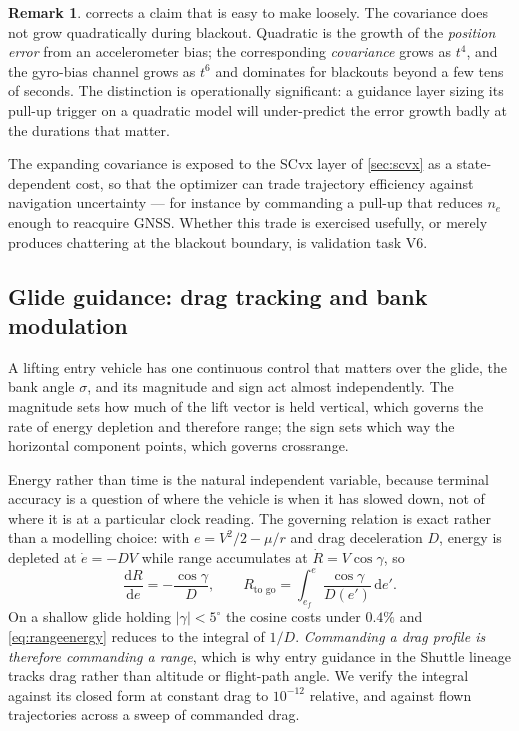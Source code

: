 \documentclass[11pt,a4paper]{article}
\theoremstyle{definition}
\newtheorem{remark}[theorem]{Remark}
\numberwithin{equation}{section}
\begin{document}
\begin{remark}
 corrects a claim that is easy to make loosely. The covariance does not grow quadratically during blackout. Quadratic is the growth of the \emph{position error} from an accelerometer bias; the corresponding \emph{covariance} grows as $t^4$, and the gyro-bias channel grows as $t^6$ and dominates for blackouts beyond a few tens of seconds. The distinction is operationally significant: a guidance layer sizing its pull-up trigger on a quadratic model will under-predict the error growth badly at the durations that matter.
\end{remark}

The expanding covariance is exposed to the SCvx layer of \cref{sec:scvx} as a state-dependent cost, so that the optimizer can trade trajectory efficiency against navigation uncertainty --- for instance by commanding a pull-up that reduces $n_e$ enough to reacquire GNSS. Whether this trade is exercised usefully, or merely produces chattering at the blackout boundary, is validation task V6.

\subsection{Glide guidance: drag tracking and bank modulation}
\label{sec:glide}

A lifting entry vehicle has one continuous control that matters over the glide, the bank angle $\sigma$, and its magnitude and sign act almost independently. The magnitude sets how much of the lift vector is held vertical, which governs the rate of energy depletion and therefore range; the sign sets which way the horizontal component points, which governs crossrange.

Energy rather than time is the natural independent variable, because terminal accuracy is a question of where the vehicle is when it has slowed down, not of where it is at a particular clock reading. The governing relation is exact rather than a modelling choice: with $e = V^2/2 - \mu/r$ and drag deceleration $D$, energy is depleted at $\dot e = -DV$ while range accumulates at $\dot R = V\cos\gamma$, so
\begin{equation}
\label{eq:rangeenergy}
\frac{\mathrm{d}R}{\mathrm{d}e} = -\frac{\cos\gamma}{D},
\qquad
R_{\text{to go}} = \int_{e_f}^{e} \frac{\cos\gamma}{D(e')}\,\mathrm{d}e'.
\end{equation}
On a shallow glide holding $|\gamma| < 5^\circ$ the cosine costs under $0.4\%$ and \cref{eq:rangeenergy} reduces to the integral of $1/D$. \emph{Commanding a drag profile is therefore commanding a range}, which is why entry guidance in the Shuttle lineage tracks drag rather than altitude or flight-path angle. We verify the integral against its closed form at constant drag to $10^{-12}$ relative, and against flown trajectories across a sweep of commanded drag.
\end{document}
